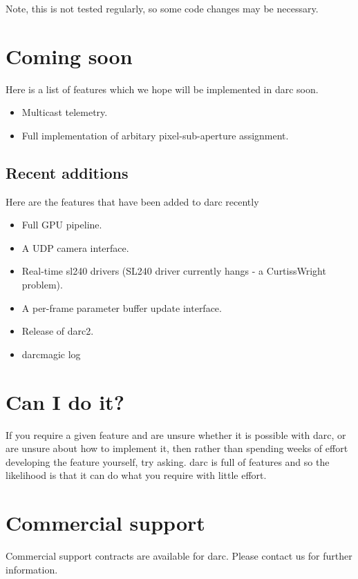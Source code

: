 \documentclass[a4,10pt]{article}
\begin{document}
Note, this is not tested regularly, so some code changes may
be necessary.

\section{Coming soon}
Here is a list of features which we hope will be implemented in darc
soon.

\begin{itemize}
\item Multicast telemetry.
\item Full implementation of arbitary pixel-sub-aperture assignment.
\end{itemize}

\subsection{Recent additions}
Here are the features that have been added to darc recently
\begin{itemize}
\item Full GPU pipeline.
\item A UDP camera interface.
\item Real-time sl240 drivers (SL240 driver currently hangs - a
  CurtissWright problem).
\item A per-frame parameter buffer update interface.
\item Release of darc2.
\item darcmagic log
\end{itemize}

\section{Can I do it?}
If you require a given feature and are unsure whether it is possible
with darc, or are unsure about how to implement it, then rather than
spending weeks of effort developing the feature yourself, try asking.
darc is full of features and so the likelihood is that it can do what
you require with little effort.

\section{Commercial support}
Commercial support contracts are available for darc.  Please contact
us for further information.
\end{document}
